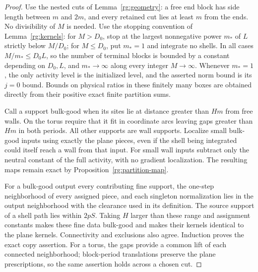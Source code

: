 \begin{proof}
Use the nested cuts of Lemma~\ref{rg:geometry}: a free end block has side
length between $m$ and $2m$, and every retained cut lies at least $m$
from the ends.  No divisibility of $M$ is needed.  Use the stopping
convention of Lemma~\ref{rg:kernels}: for $M>D_0$, stop at the largest
nonnegative power $m_*$ of $L$ strictly below $M/D_0$; for $M\le D_0$,
put $m_*=1$ and integrate no shells.  In all cases $M/m_*\le D_0L$, so
the number of terminal blocks is bounded by a constant depending on
$D_0,L$, and $m_*\to\infty$ along every integer $M\to\infty$.
Whenever $m_*=1$, the only activity level is the initialized level, and
the asserted norm bound is its $j=0$ bound.  Bounds on physical ratios
in these finitely many boxes are obtained directly from their positive
exact finite partition sums.

Call a support bulk-good when its sites lie at distance greater than
$Hm$ from free walls.  On the torus require that it fit in coordinate
arcs leaving gaps greater than $Hm$ in both periods.  All other supports
are wall supports.  Localize small bulk-good inputs using exactly the
plane pieces, even if the shell being integrated could itself reach a
wall from that input.  For small wall inputs subtract only the neutral
constant of the full activity, with no gradient localization.  The
resulting maps remain exact by Proposition~\ref{rg:partition-map}.

For a bulk-good output every contributing fine support, the one-step
neighborhood of every assigned piece, and each singleton normalization
lies in the output neighborhood with the clearance used in its
definition.  The source support of a shell path lies within $2pS$.
Taking $H$ larger than these range and assignment constants makes these
fine data bulk-good and makes their kernels identical to the plane
kernels.  Connectivity and exclusions also agree.  Induction proves
the exact copy assertion.  For a torus, the gaps provide a common lift
of each connected neighborhood; block-period translations preserve the
plane prescriptions, so the same assertion holds across a chosen cut.


\end{proof}
